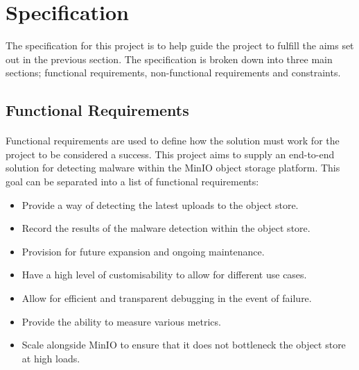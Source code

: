 \documentclass[12pt, conference, final, a4paper, onecolumn, compsoc]{IEEEtran}
\begin{document}
\subsection*{} %


\section{Specification}

The specification for this project is to help guide the project to fulfill the
aims set out in the previous section. The specification is broken down into
three main sections; functional requirements, non-functional requirements and
constraints.

\subsection*{Functional Requirements}
\paragraph{}

Functional requirements are used to define how the solution must work for the
project to be considered a success. This project aims to supply an end-to-end
solution for detecting malware within the MinIO object storage platform. This
goal can be separated into a list of functional requirements:

\begin{itemize}
  \item Provide a way of detecting the latest uploads to the object store.
  \item Record the results of the malware detection within the object store.
  \item Provision for future expansion and ongoing maintenance.
  \item Have a high level of customisability to allow for different use cases.
  \item Allow for efficient and transparent debugging in the event of failure.
  \item Provide the ability to measure various metrics.
  \item Scale alongside MinIO to ensure that it does not bottleneck the object
        store at high loads.
\end{itemize}

\end{document}
